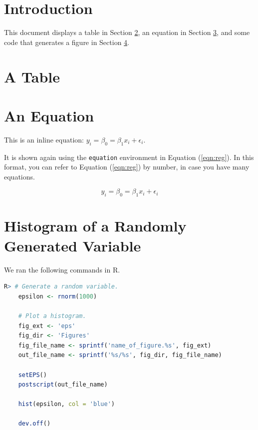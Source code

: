 \documentclass[11pt]{article}
\begin{document}
\section{Introduction}

This document displays a table in Section \ref{sec:tab}, 
an equation in Section \ref{sec:eqn}, 
and some code that generates a figure in Section \ref{sec:fig}.


\section{A Table} \label{sec:tab}






\section{An Equation} \label{sec:eqn}

This is an inline equation: $y_i = \beta_0 = \beta_1 x_i + \epsilon_i$. 

\noindent It is shown again using the \texttt{equation} environment 
 in Equation (\ref{eqn:reg}). In this format, you can refer to 
Equation (\ref{eqn:reg}) by number, in case you have many equations. 

\begin{equation} \label{eqn:reg}
y_i = \beta_0 = \beta_1 x_i + \epsilon_i
\end{equation}


\section{Histogram of a Randomly Generated Variable} \label{sec:fig}

We ran the following commands in R.

\begin{lstlisting}[language=R]
R> # Generate a random variable.
    epsilon <- rnorm(1000)
    
    # Plot a histogram.
    fig_ext <- 'eps'
    fig_dir <- 'Figures'
    fig_file_name <- sprintf('name_of_figure.%s', fig_ext)
    out_file_name <- sprintf('%s/%s', fig_dir, fig_file_name)
    
    setEPS()
    postscript(out_file_name)
    
    hist(epsilon, col = 'blue')
    
    dev.off()
    
\end{lstlisting}
\end{document}
